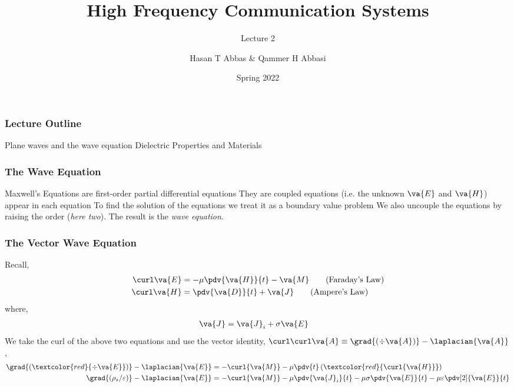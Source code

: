 \documentclass[10pt, compress]{beamer}
\title{High Frequency Communication Systems}
\subtitle{Lecture 2}
\date{Spring 2022}
\author{Hasan T Abbas \& Qammer H Abbasi}
\newcommand{\E}{\varepsilon}  %
\renewcommand{\u}{\mu}  %
\newcommand{\p}{\rho}  %
\begin{document}
\maketitle

\begin{frame}[fragile]
  \frametitle{Lecture Outline}
\begin{outline}[itemize]
  \1 Plane waves and the wave equation
  \1 Dielectric Properties and Materials
  \1 \color{red}{Nanoscale Electromagnetics}
\end{outline}
\end{frame}
\begin{frame}[fragile]
\frametitle{The Wave Equation}
\begin{outline}
  \1 Maxwell's Equations are first-order partial differential equations
    \2 They are coupled equations (i.e. the unknown $\va{E}$ and $\va{H}$) appear in each equation
  \1 To find the solution of the equations we treat it as a boundary value problem
  \1 We also uncouple the equations by raising the order (\textit{here two}).
  \1 The result is the \textit{wave equation}.
\end{outline}
\end{frame}



\begin{frame}[fragile]
  \frametitle{The Vector Wave Equation}
Recall,
\begin{align*}
  \curl \va{E} &= -\u \pdv{\va{H}}{t} - \va{M} \tag{Faraday's Law}\\
\curl \va{H} &= \pdv{\va{D}}{t} + \va{J} \tag{Ampere's Law} \\
\end{align*}
where,
\begin{align*}
  \va{J} &= \va{J}_i + \sigma \va{E}
\end{align*}
We take the curl of the above two equations and use the vector identity, $\curl \curl \va{A} \equiv \grad{(\div \va{A})} - \laplacian{\va{A}}$,
\begin{align*}
  \grad{(\textcolor{red}{\div \va{E}})}   - \laplacian{\va{E}} &= - \curl{\va{M}} - \u \pdv{t}
  \left( \textcolor{red}{\curl{\va{H}}}  \right)  \\
  \grad{(\p_s /\E)} - \laplacian{\va{E}} &= -\curl{\va{M}} - \u \pdv{\va{J}_i}{t} - \u \sigma \pdv{\va{E}}{t} - \u \E \pdv[2]{\va{E}}{t}
\end{align*}
\end{frame}
\end{document}
